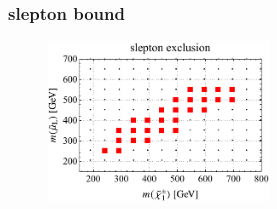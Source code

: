 \documentclass[a4paper,10pt,captions=tableheading,DIV=14]{scrartcl}
\numberwithin{equation}{section}
\begin{document}
\subsubsection{slepton bound}
\begin{figure}[h!]\centering
  \includegraphics[height=120pt]{../plots/plot_tab2slep_limit.pdf}
\end{figure}

\clearpage

\end{document}
